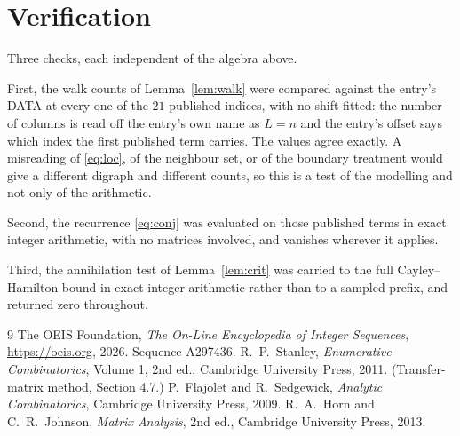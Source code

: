\documentclass[11pt,a4paper]{article}
\theoremstyle{plain}
\theoremstyle{definition}
\begin{document}
\section{Verification}

Three checks, each independent of the algebra above.

First, the walk counts of Lemma~\ref{lem:walk} were compared against the entry's DATA at
every one of the $21$ published indices, with no shift fitted: the number of columns is
read off the entry's own name as $L=n$ and the entry's offset says which index the first
published term carries. The values agree exactly. A misreading of \eqref{eq:loc}, of the
neighbour set, or of the boundary treatment would give a different digraph and different
counts, so this is a test of the modelling and not only of the arithmetic.

Second, the recurrence \eqref{eq:conj} was evaluated on those published terms in exact
integer arithmetic, with no matrices involved, and vanishes wherever it applies.

Third, the annihilation test of Lemma~\ref{lem:crit} was carried to the full
Cayley--Hamilton bound in exact integer arithmetic rather than to a sampled prefix, and
returned zero throughout.

\begin{thebibliography}{9}
 The OEIS Foundation, \emph{The On-Line Encyclopedia of Integer
Sequences}, \url{https://oeis.org}, 2026. Sequence A297436.
 R.~P.~Stanley, \emph{Enumerative Combinatorics}, Volume 1, 2nd ed.,
Cambridge University Press, 2011. (Transfer-matrix method, Section 4.7.)
 P.~Flajolet and R.~Sedgewick, \emph{Analytic Combinatorics}, Cambridge
University Press, 2009.
 R.~A.~Horn and C.~R.~Johnson, \emph{Matrix Analysis}, 2nd ed., Cambridge
University Press, 2013.
\end{thebibliography}
\end{document}
